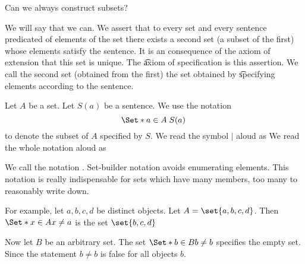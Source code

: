 

Can we always construct
subsets?


We will say that we can.
We assert that to every set and every sentence predicated of elements of the set there exists a second set (a subset of the first) whose elements satisfy the sentence.
It is an consequence of the axiom of extension that this set is unique.
The \t{axiom of specification} is this assertion.
We call the second set (obtained from the first) the set obtained by \t{specifying} elements according to the sentence.


Let $A$ be a set.
Let $S(a)$ be a sentence.
We use the notation
\[
  \Set*{a \in A}{\;S(a)\;}
\]
to denote the subset of $A$
specified by $S$.
We read the symbol $\mid$ aloud as
We read the whole notation aloud as

We call the notation
.
Set-builder notation avoids enumerating
elements.
This notation is really indispensable for
sets which have many members, too many
to reasonably write down.


For example, let $a, b, c, d$
be distinct objects.
Let $A = \set{a, b, c, d}$.
Then
$\Set*{x \in A}{x \neq a}$
is the set $\set{b, c, d}$

Now let $B$ be an arbitrary
set.
The set $\Set*{b \in B}{b \neq b}$
specifies the empty set.
Since the statement $b \neq b$ is
false for all objects $b$.

